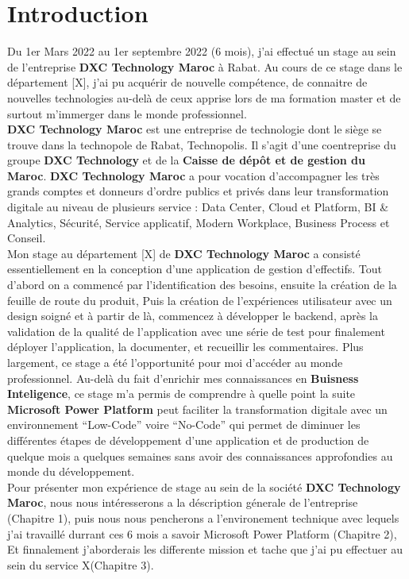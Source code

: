 \chapter{Introduction}
\vspace{0.5in}

Du 1er Mars 2022 au 1er septembre 2022 (6 mois), j’ai effectué un stage au sein de l’entreprise \textbf{DXC Technology Maroc} à Rabat. Au cours de ce stage dans le département [X], j'ai pu acquérir de nouvelle compétence, de connaitre de nouvelles technologies au-delà de ceux apprise lors de ma formation master et de surtout m'immerger dans le monde professionnel. \\ 

\textbf{DXC Technology Maroc} est une entreprise de technologie dont le siège se trouve dans la technopole de Rabat, Technopolis. Il s’agit d’une coentreprise du groupe \textbf{DXC Technology} et de la \textbf{Caisse de dépôt et de gestion du Maroc}. \textbf{DXC Technology Maroc} a pour vocation d'accompagner les très grands comptes et donneurs d'ordre publics et privés dans leur transformation digitale au niveau de plusieurs service : Data Center, Cloud et Platform, BI & Analytics, Sécurité, Service applicatif, Modern Workplace, Business Process et Conseil.\\ 

Mon stage au département [X] de \textbf{DXC Technology Maroc} a consisté essentiellement en la conception d'une application de gestion d'effectifs. Tout d'abord on a commencé par l'identification des besoins, ensuite la création de la feuille de route du produit, Puis la création de l'expériences utilisateur avec un design soigné et à partir de là, commencez à développer le backend, après la validation de la qualité de l'application avec une série de test pour finalement déployer l'application, la documenter, et recueillir les commentaires. Plus largement, ce stage a été l’opportunité pour moi d'accéder au monde professionnel. Au-delà du fait d’enrichir mes connaissances en \textbf{Buisness Inteligence}, ce stage m’a permis de comprendre à quelle point la suite \textbf{Microsoft Power Platform} peut faciliter la transformation digitale avec un environnement “Low-Code” voire “No-Code” qui permet de diminuer les différentes étapes de développement d'une application et de production de quelque mois a quelques semaines sans avoir des connaissances approfondies au monde du développement.\\

Pour présenter mon expérience de stage au sein de la société \textbf{DXC Technology Maroc}, nous nous intéresserons a la déscription génerale de l'entreprise (Chapitre 1), puis nous nous pencherons a l'environement technique avec lequels j'ai travaillé durrant ces 6 mois a savoir Microsoft Power Platform (Chapitre 2), Et finnalement j'aborderais les differente mission et tache que j'ai pu effectuer au sein du service X(Chapitre 3). 